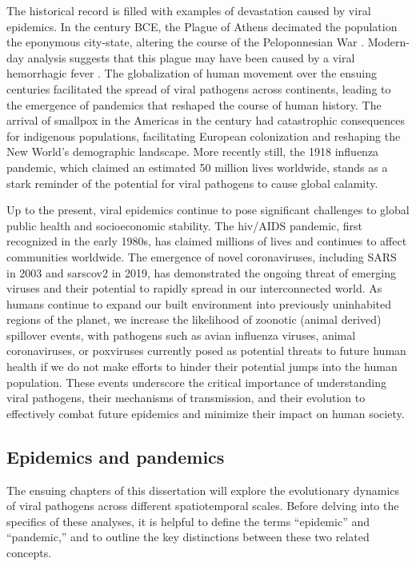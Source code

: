 The historical record is filled with examples of devastation caused by viral epidemics.
In the  century BCE, the Plague of Athens decimated the population the eponymous city-state, altering the course of the Peloponnesian War \citep{thucydides1972history}.
Modern-day analysis suggests that this plague may have been caused by a viral hemorrhagic fever \citep{olson1996thucydides}.
The globalization of human movement over the ensuing centuries facilitated the spread of viral pathogens across continents, leading to the emergence of pandemics that reshaped the course of human history.
The arrival of smallpox in the Americas in the  century had catastrophic consequences for indigenous populations, facilitating European colonization and reshaping the New World's demographic landscape.
More recently still, the 1918 influenza pandemic, which claimed an estimated 50 million lives worldwide, stands as a stark reminder of the potential for viral pathogens to cause global calamity.

Up to the present, viral epidemics continue to pose significant challenges to global public health and socioeconomic stability.
The \gls{hiv}/AIDS pandemic, first recognized in the early 1980s, has claimed millions of lives and continues to affect communities worldwide.
The emergence of novel coronaviruses, including SARS in 2003 and \gls{sarscov2} in 2019, has demonstrated the ongoing threat of emerging viruses and their potential to rapidly spread in our interconnected world.
As humans continue to expand our built environment into previously uninhabited regions of the planet, we increase the likelihood of zoonotic (animal derived) spillover events, with pathogens such as avian influenza viruses, animal coronaviruses, or poxviruses currently posed as potential threats to future human health if we do not make efforts to hinder their potential jumps into the human population.
These events underscore the critical importance of understanding viral pathogens, their mechanisms of transmission, and their evolution to effectively combat future epidemics and minimize their impact on human society.

\subsection{Epidemics and pandemics}\label{sec:epidemicsVsPandemics}
The ensuing chapters of this dissertation will explore the evolutionary dynamics of viral pathogens across different spatiotemporal scales.
Before delving into the specifics of these analyses, it is helpful to define the terms ``epidemic'' and ``pandemic,'' and to outline the key distinctions between these two related concepts.

